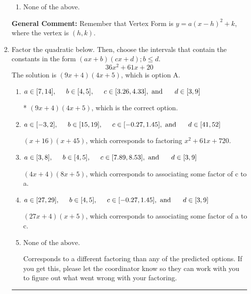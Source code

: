 \documentclass{extbook}[14pt]
\newcommand{\litem}[1]{\item #1

\rule{\textwidth}{0.4pt}}
\begin{document}
\begin{enumerate}
{\begin{enumerate}[label=\Alph*.]
\begin{multicols}{2}
\end{multicols}\item None of the above.\end{enumerate}
\textbf{General Comment:} Remember that Vertex Form is $y = a(x-h)^2+k$, where the vertex is $(h, k)$.
}
\litem{
Factor the quadratic below. Then, choose the intervals that contain the constants in the form $(ax+b)(cx+d); b \leq d.$
\[ 36x^{2} +61 x + 20 \]The solution is \( (9x + 4)(4x + 5) \), which is option A.\begin{enumerate}[label=\Alph*.]
\item \( a \in [7, 14], \hspace*{5mm} b \in [4, 5], \hspace*{5mm} c \in [3.26, 4.33], \text{ and } \hspace*{5mm} d \in [3, 9] \)

* $(9x + 4)(4x + 5)$, which is the correct option.
\item \( a \in [-3, 2], \hspace*{5mm} b \in [15, 19], \hspace*{5mm} c \in [-0.27, 1.45], \text{ and } \hspace*{5mm} d \in [41, 52] \)

 $(x + 16)(x + 45)$, which corresponds to factoring $x^{2} +61 x + 720$.
\item \( a \in [3, 8], \hspace*{5mm} b \in [4, 5], \hspace*{5mm} c \in [7.89, 8.53], \text{ and } \hspace*{5mm} d \in [3, 9] \)

 $(4x + 4)(8x + 5)$, which corresponds to associating some factor of c to a.
\item \( a \in [27, 29], \hspace*{5mm} b \in [4, 5], \hspace*{5mm} c \in [-0.27, 1.45], \text{ and } \hspace*{5mm} d \in [3, 9] \)

 $(27x + 4)(x + 5)$, which corresponds to associating some factor of a to c.
\item \( \text{None of the above.} \)

 Corresponds to a different factoring than any of the predicted options. If you get this, please let the coordinator know so they can work with you to figure out what went wrong with your factoring.
\end{enumerate}

}
\end{enumerate}
\end{document}
